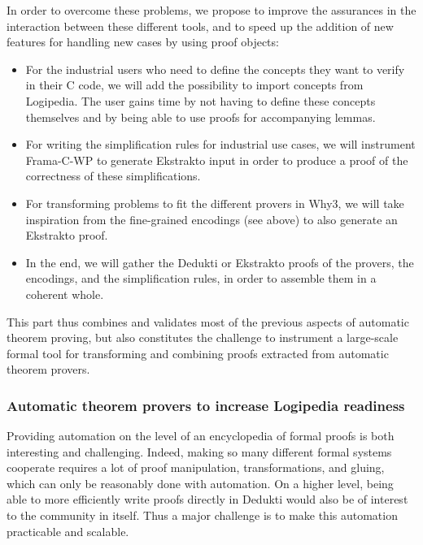 In order to overcome these problems, we propose to improve the assurances in
the interaction between these different tools, and to speed up the addition of
new features for handling new cases by using proof objects:
\begin{itemize}
\item For the industrial users who need to define the concepts they want
  to verify in their C code, we will add the possibility to import
  concepts from Logipedia. The user gains time by not having to define
  these concepts themselves and by being able to use proofs for accompanying
  lemmas.

\item For writing the simplification rules for industrial use cases,
  we will instrument Frama-C-WP to generate
  Ekstrakto input in order to produce a proof of the correctness of
  these simplifications.

\item For transforming problems to fit the different provers
  in Why3, we will take inspiration from the fine-grained encodings
  (see above) to also generate an Ekstrakto proof.

\item In the end, we will gather the Dedukti or Ekstrakto proofs of the
  provers, the encodings, and the simplification rules, in order to
  assemble them in a coherent whole.
\end{itemize}

This part thus combines and validates most of the previous aspects of
automatic theorem proving, but also constitutes the
challenge to instrument a large-scale formal tool for transforming
and combining proofs extracted from automatic theorem provers.

\subsubsection*{Automatic theorem provers to increase Logipedia readiness}

Providing automation on the level of an encyclopedia of formal proofs
is both interesting and challenging. Indeed, making so many different formal
systems cooperate requires a lot of proof manipulation,
transformations, and gluing, which can only be reasonably done with
automation. On a higher level, being able to more efficiently write
proofs directly in Dedukti would also be of interest to the community in
itself. Thus a major challenge is to make this automation practicable and scalable.

